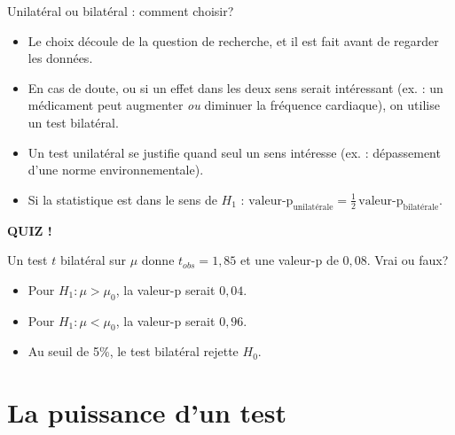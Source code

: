 \documentclass{BeamerTemplate}
\begin{document}
\begin{frame}[t]{Unilatéral ou bilatéral : comment choisir?}
  \begin{itemize}\itemsep 1.5mm
    \item Le choix découle de la \alert{question de recherche}, et il est fait \alert{avant} de regarder les données.
    \item<2-> En cas de doute, ou si un effet dans les deux sens serait intéressant (ex. : un médicament peut augmenter \emph{ou} diminuer la fréquence cardiaque), on utilise un test \alert{bilatéral}.
    \item<3-> Un test unilatéral se justifie quand seul un sens intéresse (ex. : dépassement d'une norme environnementale).
    \item<4-> Si la statistique est dans le sens de $H_1$ : $\text{valeur-p}_{\text{unilatérale}} = \frac{1}{2}\,\text{valeur-p}_{\text{bilatérale}}$.
  \end{itemize}

  \vspace{-2mm}
\end{frame}

\begin{frame}[plain,t]
  \centerline{\LARGE\bfseries\alert{QUIZ !}}

  \medskip
  Un test $t$ bilatéral sur $\mu$ donne $t_{obs} = 1{,}85$ et une valeur-p de $0{,}08$. Vrai ou faux?
  \begin{itemize}\itemsep 1.2cm
    \item Pour $H_1 : \mu > \mu_0$, la valeur-p serait $0{,}04$.
    \item<2-> Pour $H_1 : \mu < \mu_0$, la valeur-p serait $0{,}96$.
    \item<3-> Au seuil de 5\%, le test bilatéral rejette $H_0$.
  \end{itemize}
\end{frame}

\section{La puissance d'un test}
\end{document}
